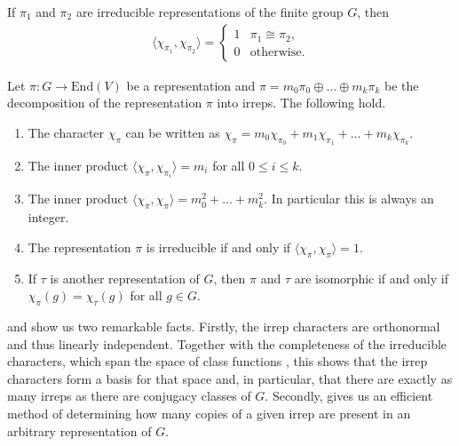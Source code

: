 \begin{lemma} \label{lem:character-orthogonality}
    If $\pi_1$ and $\pi_2$ are irreducible representations of the finite group $G$, then 
    \begin{align}
        \langle \chi_{\pi_1}, \chi_{\pi_2}\rangle = \begin{cases}
            1 & \pi_1 \cong \pi_2, \\
            0 & \text{otherwise}.
        \end{cases}
    \end{align}
\end{lemma}

\begin{cor} \label{cor:character-relations}
    Let $\pi : G \to \mathrm{End}(V)$ be a representation and $\pi = m_0 \pi_0 \oplus \dots \oplus m_k \pi_k$ be the decomposition of the representation $\pi$ into irreps. The following hold.
    \begin{enumerate}
        \item The character $\chi_{\pi}$ can be written as $\chi_{\pi} = m_0 \chi_{\pi_0} + m_1 \chi_{\pi_1} + \dots + m_k \chi_{\pi_k}$.
        \item \label{item:irrep-mult-test} The inner product $\langle \chi_{\pi}, \chi_{\pi_i}\rangle = m_i$ for all $0 \leq i \leq k$.
        \item The inner product $\langle \chi_{\pi}, \chi_{\pi} \rangle = m_0^2 + \dots + m_k^2$. In particular this is always an integer.
        \item The representation $\pi$ is irreducible if and only if $\langle \chi_{\pi}, \chi_{\pi} \rangle = 1$.
        \item If $\tau$ is another representation of $G$, then $\pi$ and $\tau$ are isomorphic if and only if $\chi_{\pi}(g) = \chi_{\tau}(g)$ for all $g \in G$.
    \end{enumerate}
\end{cor}

 and  show us two remarkable facts.
Firstly, the irrep characters are orthonormal and thus linearly independent.
Together with the completeness of the irreducible characters, which span the space of class functions \cite{sagan2001symmetric}, this shows that the irrep characters form a basis for that space and, in particular, that there are exactly as many irreps as there are conjugacy classes of $G$.
Secondly,  gives us an efficient method of determining how many copies of a given irrep are present in an arbitrary representation of $G$.